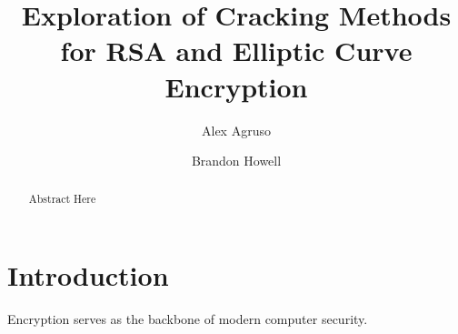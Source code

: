 \documentclass[12pt]{article}
\title{Exploration of Cracking Methods for RSA and Elliptic Curve Encryption}
\author{Alex Agruso \and Brandon Howell}
\begin{document}
\setlength{\headheight}{2.5in}
\setlength{\parskip}{0.25in}

\maketitle
\pagebreak


\setlength{\headheight}{1.5in}

\begin{abstract}
    Abstract Here
\end{abstract}
\pagebreak


\setlength{\headheight}{1in}
\setlength{\parskip}{0.25in}

\section*{Introduction}

Encryption serves as the backbone of modern computer security. 
\end{document}
